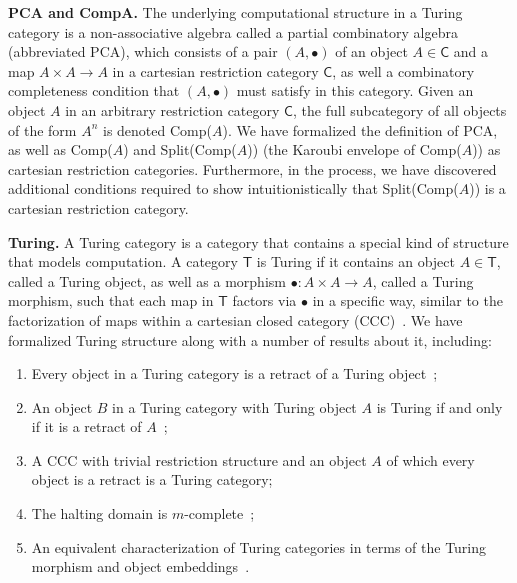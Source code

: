\documentclass{entcs} \usepackage{entcsmacro}
\begin{document}
{\bfseries PCA and CompA.} The underlying computational structure in a Turing category is a non-associative algebra called a partial combinatory algebra (abbreviated PCA), which consists of a pair $(A, \bullet)$ of an object $A \in \mathsf{C}$ and a map $A \times A \to A$ in a cartesian restriction category $\mathsf{C}$, as well a combinatory completeness condition that $(A, \bullet)$ must satisfy in this category. Given an object $A$ in an arbitrary restriction category $\mathsf{C}$, the full subcategory of all objects of the form $A^n$ is denoted Comp($A$). We have formalized the definition of PCA, as well as Comp($A$) and Split(Comp($A$)) (the Karoubi envelope of Comp($A$)) as cartesian restriction categories. Furthermore, in the process, we have discovered additional conditions required to show intuitionistically that Split(Comp($A$)) is a cartesian restriction category. 



{\bfseries Turing.} A Turing category is a category that contains a special kind of structure that models computation. A category $\mathsf{T}$ is Turing if it contains an object $A \in \mathsf{T}$, called a Turing object, as well as a morphism $\bullet : A \times A \to A$, called a Turing morphism, such that each map in $\mathsf{T}$ factors via $\bullet$ in a specific way, similar to the factorization of maps within a cartesian closed category (CCC)~\cite{HOCL}. We have formalized Turing structure along with a number of results about it, including:


\begin{enumerate}
\item Every object in a Turing category is a retract of a Turing object~\cite{Turing};
\item An object $B$ in a Turing category with Turing object $A$ is Turing if and only if it is a retract of $A$~\cite{Turing};
	
\item A CCC with trivial restriction structure and an object $A$ of which every object is a retract is a Turing category;
\item The halting domain is $m$-complete~\cite{Turing};
	
\item An equivalent characterization of Turing categories in terms of the Turing morphism and object embeddings~\cite{Turing}.
	
\end{enumerate}
\end{document}
